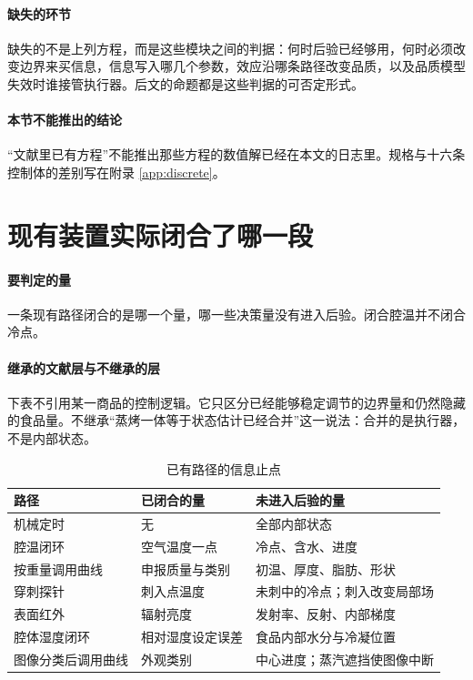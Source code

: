 \paragraph{缺失的环节}
缺失的不是上列方程，而是这些模块之间的判据：何时后验已经够用，何时必须改变边界来买信息，信息写入哪几个参数，效应沿哪条路径改变品质，以及品质模型失效时谁接管执行器。后文的命题都是这些判据的可否定形式。

\paragraph{本节不能推出的结论}
“文献里已有方程”不能推出那些方程的数值解已经在本文的日志里。规格与十六条控制体的差别写在附录 \ref{app:discrete}。

\section{现有装置实际闭合了哪一段}

\paragraph{要判定的量}
一条现有路径闭合的是哪一个量，哪一些决策量没有进入后验。闭合腔温并不闭合冷点。

\paragraph{继承的文献层与不继承的层}
下表不引用某一商品的控制逻辑。它只区分已经能够稳定调节的边界量和仍然隐藏的食品量。不继承“蒸烤一体等于状态估计已经合并”这一说法：合并的是执行器，不是内部状态。

\begin{table}[ht]
\centering
\caption{已有路径的信息止点}
\begin{tabularx}{\textwidth}{lXX}
\toprule
路径 & 已闭合的量 & 未进入后验的量 \\
\midrule
机械定时 & 无 & 全部内部状态 \\
腔温闭环 & 空气温度一点 & 冷点、含水、进度 \\
按重量调用曲线 & 申报质量与类别 & 初温、厚度、脂肪、形状 \\
穿刺探针 & 刺入点温度 & 未刺中的冷点；刺入改变局部场 \\
表面红外 & 辐射亮度 & 发射率、反射、内部梯度 \\
腔体湿度闭环 & 相对湿度设定误差 & 食品内部水分与冷凝位置 \\
图像分类后调用曲线 & 外观类别 & 中心进度；蒸汽遮挡使图像中断 \\
\bottomrule
\end{tabularx}
\end{table}

